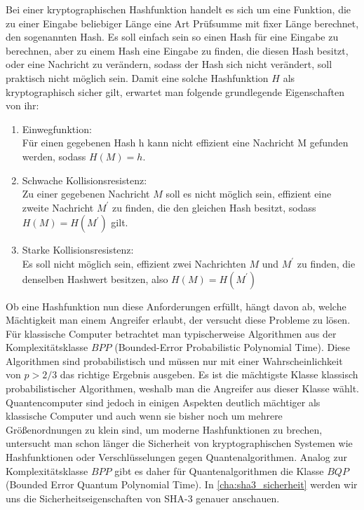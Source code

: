 Bei einer kryptographischen Hashfunktion handelt es sich um eine Funktion, die zu einer Eingabe beliebiger Länge
eine Art Prüfsumme mit fixer Länge berechnet, den sogenannten Hash. 
Es soll einfach sein so einen Hash für eine Eingabe zu berechnen, aber zu einem Hash eine Eingabe zu finden,
die diesen Hash besitzt, oder eine Nachricht zu verändern, sodass der Hash sich nicht verändert, soll praktisch nicht möglich sein.
Damit eine solche Hashfunktion $H$ als kryptographisch sicher gilt, erwartet man folgende grundlegende Eigenschaften von ihr:
\begin{enumerate}
    \item Einwegfunktion:\\
    Für einen gegebenen Hash h kann nicht effizient eine Nachricht M gefunden werden, sodass $H(M) = h$.
	\item Schwache Kollisionsresistenz: \\
    Zu einer gegebenen Nachricht $M$ soll es nicht möglich sein, effizient eine zweite Nachricht $M^\prime$ zu finden,
    die den gleichen Hash besitzt, sodass $H(M) = H(M^\prime)$ gilt.
	\item Starke Kollisionsresistenz: \\
    Es soll nicht möglich sein, effizient zwei Nachrichten $M$ und $M^\prime$ zu finden, die denselben Hashwert besitzen,
    also $H(M) = H(M^\prime)$ \cite{rogaway2004crypto}
\end{enumerate}
Ob eine Hashfunktion nun diese Anforderungen erfüllt, hängt davon ab, welche Mächtigkeit man einem Angreifer erlaubt,
der versucht diese Probleme zu lösen. Für klassische Computer betrachtet man typischerweise Algorithmen aus der Komplexitätsklasse $BPP$ (Bounded-Error Probabilistic Polynomial Time).
Diese Algorithmen sind probabilistisch und müssen nur mit einer Wahrscheinlichkeit von $p > 2/3$ das richtige Ergebnis ausgeben.
Es ist die mächtigste Klasse klassisch probabilistischer Algorithmen, weshalb man die Angreifer aus dieser Klasse wählt.
Quantencomputer sind jedoch in einigen Aspekten deutlich mächtiger als klassische Computer und auch wenn sie bisher
noch um mehrere Größenordnungen zu klein sind, um moderne Hashfunktionen zu brechen, untersucht man schon länger die Sicherheit
von kryptographischen Systemen wie Hashfunktionen oder Verschlüsselungen gegen Quantenalgorithmen. Analog zur Komplexitätsklasse $BPP$
gibt es daher für Quantenalgorithmen die Klasse $BQP$ (Bounded Error Quantum Polynomial Time). In \ref{cha:sha3_sicherheit} werden wir uns die
Sicherheitseigenschaften von SHA-3 genauer anschauen. \\

